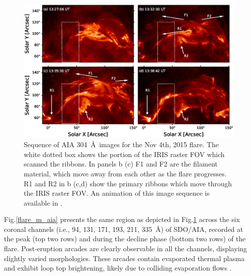 \begin{figure}[ht!]
    \begin{center}
    \includegraphics[trim={1cm 1.2cm 1cm 2.3cm}, clip, width=\textwidth]{Figures/nov_flare_304_aa_evolv.eps}
    \end{center}
    \caption[Sequence of AIA 304 {\AA} images for the Nov 4th, 2015 flare.]{Sequence of AIA 304~{\AA}~images for the Nov 4th, 2015 flare. The white dotted box shows the portion of the IRIS raster FOV which scanned the ribbons. In panels b (c) F1 and F2 are the filament material, which move away from each other as the flare progresses. R1 and R2 in b (c,d) show the primary ribbons which move through the IRIS raster FOV. An animation of this image sequence is available in \cite{roy24}.}
    \label{flare_m_ev}
\end{figure}

Fig.\ref{flare_m_aia} presents the same region as depicted in Fig.\ref{flare_m_ev} across the six coronal channels (i.e., 94, 131, 171, 193, 211, 335~{\AA}) of SDO/AIA, recorded at the peak (top two rows) and during the decline phase (bottom two rows) of the flare. Post-eruption arcades \citep[][]{TriBC_2004} are clearly observable in all the channels, displaying slightly varied morphologies. These arcades contain evaporated thermal plasma and exhibit loop top brightening, likely due to colliding evaporation flows \citep[see, e.g.,][]{sharma16, patsourakos04}.

